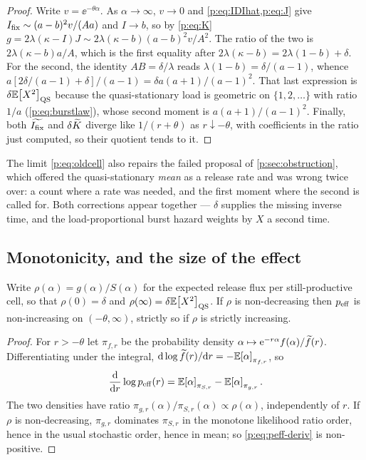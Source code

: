 \begin{proof}
Write $v=\ee^{-\theta\alpha}$. As $\alpha\to\infty$, $v\to0$ and
\cref{p:eq:IDIhat,p:eq:J} give $I_{\mathrm{fix}}\sim(a-b)^2v/(Aa)$ and $I\to b$, so by
\cref{p:eq:K} $g=2\lambda(\kappa-I)J\sim2\lambda(\kappa-b)(a-b)^2v/A^2$. The
ratio of the two is $2\lambda(\kappa-b)a/A$, which is the first equality
after $2\lambda(\kappa-b)=2\lambda(1-b)+\delta$. For the second, the
identity $AB=\delta/\lambda$ reads $\lambda(1-b)=\delta/(a-1)$, whence
$a[2\delta/(a-1)+\delta]/(a-1)=\delta a(a+1)/(a-1)^2$. That last expression
is $\delta\mathbb{E}\!\left[X^2\right]_{\rm QS}$ because the quasi-stationary load is
geometric on $\{1,2,\ldots\}$ with ratio $1/a$ (\cref{p:eq:burstlaw}), whose
second moment is $a(a+1)/(a-1)^2$. Finally, both $\widetilde{I_{\mathrm{fix}}}$ and
$\delta\widetilde{K}$ diverge like $1/(r+\theta)$ as $r\downarrow-\theta$, with
coefficients in the ratio just computed, so their quotient tends to it.
\end{proof}

\noindent
The limit \cref{p:eq:oldcell} also repairs the failed proposal of
\cref{p:sec:obstruction}, which offered the quasi-stationary \emph{mean} as
a release rate and was wrong twice over: a count where a rate was needed,
and the first moment where the second is called for. Both corrections appear
together --- $\delta$ supplies the missing inverse time, and the
load-proportional burst hazard weights by $X$ a second time.

\subsection{Monotonicity, and the size of the effect}
\label{p:sec:span}

\begin{proposition}
\label{p:prop:peff-monotone}
Write $\rho(\alpha)=g(\alpha)/S(\alpha)$ for the expected release flux per
still-productive cell, so that $\rho(0)=\delta$ and
$\rho(\infty)=\delta\mathbb{E}\!\left[X^2\right]_{\rm QS}$. If $\rho$ is non-decreasing then
$p_{\rm eff}$ is non-increasing on $(-\theta,\infty)$, strictly so if $\rho$
is strictly increasing.
\end{proposition}

\begin{proof}
For $r>-\theta$ let $\pi_{f,r}$ be the probability density
$\alpha\mapsto\mathrm{e}^{-r\alpha}f(\alpha)/\widetilde{f}(r)$. Differentiating under the
integral, $\mathrm{d}\log\widetilde{f}(r)/\mathrm{d} r=-\mathbb{E}\!\left[\alpha\right]_{\pi_{f,r}}$, so
\begin{equation}
\frac{\mathrm{d}}{\mathrm{d} r}\log p_{\rm eff}(r)
=\mathbb{E}\!\left[\alpha\right]_{\pi_{S,r}}-\mathbb{E}\!\left[\alpha\right]_{\pi_{g,r}}.
\label{p:eq:peff-deriv}
\end{equation}
The two densities have ratio
$\pi_{g,r}(\alpha)/\pi_{S,r}(\alpha)\propto\rho(\alpha)$, independently of
$r$. If $\rho$ is non-decreasing, $\pi_{g,r}$ dominates $\pi_{S,r}$ in the
monotone likelihood ratio order, hence in the usual stochastic order, hence
in mean; so \cref{p:eq:peff-deriv} is non-positive.
\end{proof}

